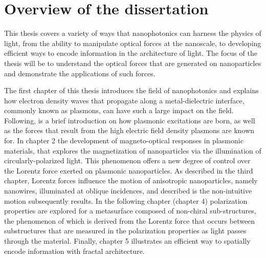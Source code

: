 \section{Overview of the dissertation}
This thesis covers a variety of ways that nanophotonics can harness the physics of light, from the ability to manipulate optical forces at the nanoscale, to developing efficient ways to encode information in the architecture of light. The focus of the thesis will be to understand the optical forces that are generated on nanoparticles and demonstrate the applications of such forces. 

The first chapter of this thesis introduces the field of nanophotonics and explains how electron density waves that propagate along a metal-dielectric interface, commonly known as plasmons, can have such a large impact on the field. Following, is a brief introduction on how plasmonic excitations are born, as well as the forces that result from the high electric field density plasmons are known for.
In chapter 2 the development of magneto-optical responses in plasmonic materials, that explores the magnetization of nanoparticles via the illumination of circularly-polarized light. This phenomenon offers a new degree of control over the Lorentz force exerted on plasmonic nanoparticles. As described in the third chapter, Lorentz forces influence the motion of anisotropic nanoparticles, namely nanowires, illuminated at oblique incidences, and described is the non-intuitive motion subsequently results. In the following chapter (chapter 4) polarization properties are explored for a metasurface composed of non-chiral sub-structures, the phenomenon of which is derived from the Lorentz force that occurs between substructures that are measured in the polarization properties as light passes through the material. Finally, chapter 5 illustrates an efficient way to spatially encode information with fractal architecture.



